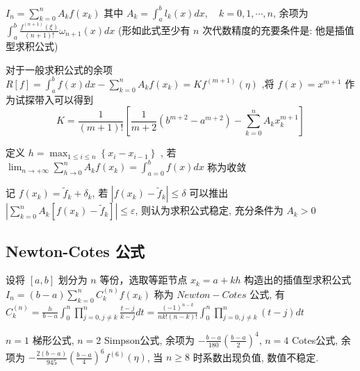 \documentclass[10pt]{yerbaformat}
\begin{document}
\begin{definition}[插值型求积公式]
    $I_{n}=\sum_{k=0}^{n} A_{k} f\left(x_{k}\right)$ 其中 $A_{k}=\int_{a}^{b} l_{k}(x) d x, \quad k=0,1, \cdots, n$, 余项为 $\int_{a}^{b} \frac{f^{(n+1)}(\xi)}{(n+1) !} \omega_{n+1}(x) d x$ (形如此式至少有 $n$ 次代数精度的充要条件是: 他是插值型求积公式)
\end{definition}

\par 对于一般求积公式的余项 $R[f]=\int_{a}^{b} f(x) d x-\sum_{k=0}^{n} A_{k} f\left(x_{k}\right)=K f^{(m+1)}(\eta)$ ,将 $f(x)=x^{m+1}$ 作为试探带入可以得到 $$K=\frac{1}{(m+1) !}\left[\frac{1}{m+2}\left(b^{m+2}-a^{m+2}\right)-\sum_{k=0}^{n} A_{k} x_{k}^{m+1}\right]$$


\begin{definition}[收敛]
    定义 $h=\max _{1 \leq i \leq n}\left\{x_{i}-x_{i-1}\right\}$ , 若 $\lim _{n \rightarrow+\infty} \sum_{h \rightarrow 0}^{n} A_{k} f\left(x_{k}\right)=\int_{a=0}^{b} f(x) d x$ 称为收敛
\end{definition}

\begin{definition}[稳定]
    记 $f\left(x_{k}\right)=\widetilde{f}_{k}+\delta_{k}$, 若 $\left|f\left(x_{k}\right)-\tilde{f}_{k}\right| \leq \delta$ 可以推出 $\left|\sum_{k=0}^{n} A_{k}\left[f\left(x_{k}\right)-\tilde{f}_{k}\right]\right| \leq \varepsilon$, 则认为求积公式稳定, 充分条件为 $A_{k} > 0$
\end{definition}

\subsection{Newton-Cotes 公式}

\begin{definition}
    设将 $[a, b]$ 划分为 $n$ 等份，选取等距节点 $x_{k}=a+k h$ 构造出的插值型求积公式 $I_{n}=(b-a) \sum_{k=0}^{n} C_{k}^{(n)} f\left(x_{k}\right)$ 称为 $ Newton-Cotes$ 公式, 有 $C_{k}^{(n)}=\frac{h}{b-a} \int_{0}^{n} \prod_{j=0, j \neq k}^{n} \frac{t-j}{k-j} d t=\frac{(-1)^{n-k}}{n k !(n-k) !} \int_{0}^{n} \prod_{j=0, j \neq k}^{n}(t-j) d t$
\end{definition}

\par $n=1$ 梯形公式, $n=2$ Simpson公式, 余项为 $-\frac{b-a}{180}\left(\frac{b-a}{2}\right)^{4}$, $n=4$ Cotes公式, 余项为 $-\frac{2(b-a)}{945}\left(\frac{b-a}{4}\right)^{6} f^{(6)}(\eta)$, 当 $n \geq 8$ 时系数出现负值, 数值不稳定.
\end{document}
